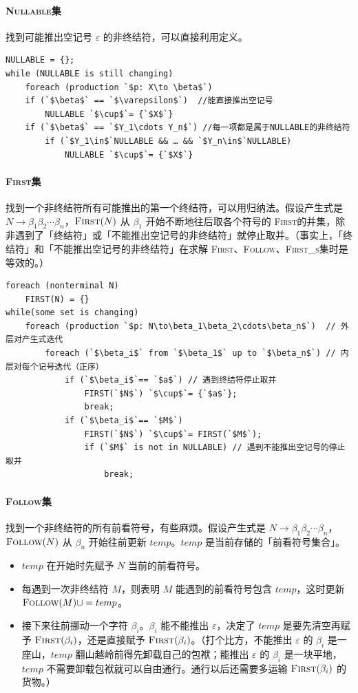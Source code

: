 \documentclass[UTF8]{ctexart}
\newcommand\FIRST{\textsc{First}}
\newcommand\FOLLOW{\textsc{Follow}}
\newcommand\NULLABLE{\textsc{Nullable}}
\newcommand\FIRSTS{\textsc{First\_s}}
\newcommand\Notes[1]{\textcolor{yellow!50!black}{\small #1}}
\begin{document}
\paragraph{\NULLABLE 集} 找到可能推出空记号 $\varepsilon$ 的非终结符，可以直接利用定义。
\begin{lstlisting}
NULLABLE = {};
while (NULLABLE is still changing)
    foreach (production `$p: X\to \beta$`)
    if (`$\beta$` == `$\varepsilon$`)  //能直接推出空记号
        NULLABLE `$\cup$`= {`$X$`}
    if (`$\beta$` == `$Y_1\cdots Y_n$`) //每一项都是属于NULLABLE的非终结符
        if (`$Y_1\in$`NULLABLE && … && `$Y_n\in$`NULLABLE)
            NULLABLE `$\cup$`= {`$X$`}
\end{lstlisting}

\paragraph{\FIRST 集} 找到一个非终结符所有可能推出的第一个终结符，可以用归纳法。假设产生式是 $N\to \beta_1\beta_2\cdots\beta_n$，$\FIRST(N)$ 从 $\beta_1$ 开始不断地往后取各个符号的 \FIRST 的并集，除非遇到了「终结符」或「不能推出空记号的非终结符」就停止取并。\Notes{（事实上，「终结符」和「不能推出空记号的非终结符」在求解 \FIRST、\FOLLOW、\FIRSTS 集时是等效的。）}
\begin{lstlisting}
foreach (nonterminal N)
    FIRST(N) = {}
while(some set is changing)
    foreach (production `$p: N\to\beta_1\beta_2\cdots\beta_n$`)  // 外层对产生式迭代
        foreach (`$\beta_i$` from `$\beta_1$` up to `$\beta_n$`) // 内层对每个记号迭代（正序）
            if (`$\beta_i$`== `$a$`) // 遇到终结符停止取并
                FIRST(`$N$`) `$\cup$`= {`$a$`};
                break;
            if (`$\beta_i$`== `$M$`)
                FIRST(`$N$`) `$\cup$`= FIRST(`$M$`);
                if (`$M$` is not in NULLABLE) // 遇到不能推出空记号的停止取并
                    break;
\end{lstlisting}

\paragraph{\FOLLOW 集} 找到一个非终结符的所有前看符号，有些麻烦。假设产生式是 $N\to \beta_1\beta_2\cdots\beta_n$，$\FOLLOW(N)$ 从 $\beta_n$ 开始往前更新 $temp$。$temp$ 是当前存储的「前看符号集合」。
\begin{itemize}
  \item $temp$ 在开始时先赋予 $N$ 当前的前看符号。
  \item 每遇到一次非终结符 $M$，则表明 $M$ 能遇到的前看符号包含 $temp$，这时更新 $\FOLLOW(M) \cup= temp$。
  \item 接下来往前挪动一个字符 $\beta_i$。$\beta_i$ 能不能推出 $\varepsilon$，决定了 $temp$ 是要先清空再赋予 $\FIRST(\beta_i)$，还是直接赋予 $\FIRST(\beta_i)$。\Notes{（打个比方，不能推出 $\varepsilon$ 的 $\beta_i$ 是一座山，$temp$ 翻山越岭前得先卸载自己的包袱；能推出 $\varepsilon$ 的 $\beta_i$ 是一块平地，$temp$ 不需要卸载包袱就可以自由通行。通行以后还需要多运输 $\FIRST(\beta_i)$ 的货物。）}
\end{itemize}
\end{document}
